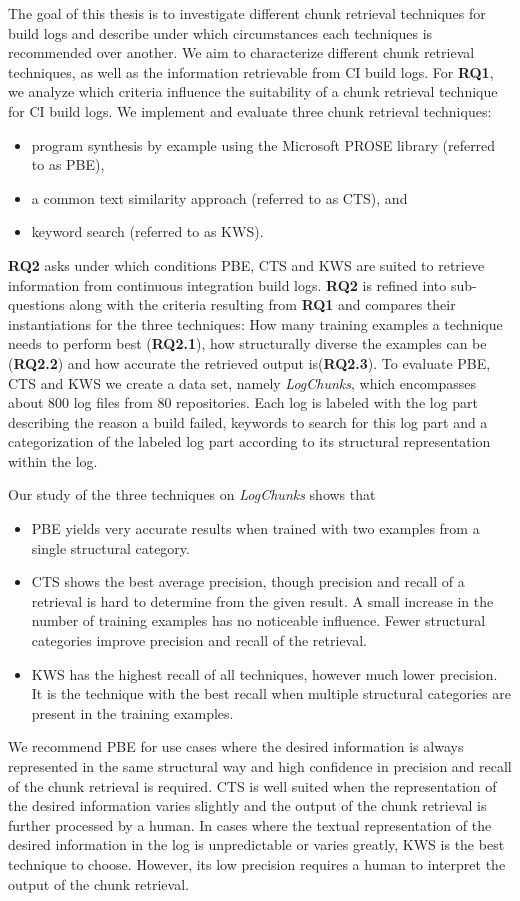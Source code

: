 \documentclass[\myrootdir/main.tex]{subfiles}
\begin{document}
The goal of this thesis is to investigate different chunk retrieval techniques for build logs and describe under which circumstances each techniques is recommended over another.
We aim to characterize different chunk retrieval techniques, as well as the information retrievable from CI build logs.
For \textbf{RQ1}, we analyze which criteria influence the suitability of a chunk retrieval technique for CI build logs.
We implement and evaluate three chunk retrieval techniques:
\begin{itemize}
  \item program synthesis by example using the Microsoft PROSE library (referred to as PBE),
  \item a common text similarity approach (referred to as CTS), and
  \item keyword search (referred to as KWS).
\end{itemize}
\textbf{RQ2} asks under which conditions PBE, CTS and KWS are suited to retrieve information from continuous integration build logs.
\textbf{RQ2} is refined into sub-questions along with the criteria resulting from \textbf{RQ1} and compares their instantiations for the three techniques:
How many training examples a technique needs to perform best (\textbf{RQ2.1}), how structurally diverse the examples can be (\textbf{RQ2.2}) and how accurate the retrieved output is(\textbf{RQ2.3}).
To evaluate PBE, CTS and KWS we create a data set, namely \emph{LogChunks}, which encompasses about 800 log files from 80 repositories.
Each log is labeled with the log part describing the reason a build failed, keywords to search for this log part and a categorization of the labeled log part according to its structural representation within the log.

Our study of the three techniques on \emph{LogChunks} shows that
\begin{itemize}
  \item PBE yields very accurate results when trained with two examples from a single structural category.
  \item CTS shows the best average precision, though precision and recall of a retrieval is hard to determine from the given result.
  A small increase in the number of training examples has no noticeable influence.
  Fewer structural categories improve precision and recall of the retrieval.
  \item KWS has the highest recall of all techniques, however much lower precision.
  It is the technique with the best recall when multiple structural categories are present in the training examples.
\end{itemize}
We recommend PBE for use cases where the desired information is always represented in the same structural way and high confidence in precision and recall of the chunk retrieval is required.
CTS is well suited when the representation of the desired information varies slightly and the output of the chunk retrieval is further processed by a human.
In cases where the textual representation of the desired information in the log is unpredictable or varies greatly, KWS is the best technique to choose.
However, its low precision requires a human to interpret the output of the chunk retrieval.
\end{document}
